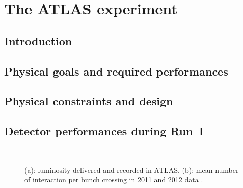 \chapter{The ATLAS experiment}
\label{chap:atlas}


\minitoc\vspace{5ex}

\section*{Introduction}

\section{Physical goals and required performances}
\label{sec:atlas_overview}


\section{Physical constraints and design}
\label{sec:atlas_design}

\section{Detector performances during Run~I}
\label{sec:atlas_performances}

\begin{figure}[h!]\centering
  \\
\caption{(a): luminosity delivered and recorded in ATLAS. (b): mean number of interaction per bunch crossing in 2011 and 2012 data \cite{twiki_lumi}.}
\label{fig:intlumi_atlas}
\end{figure}

